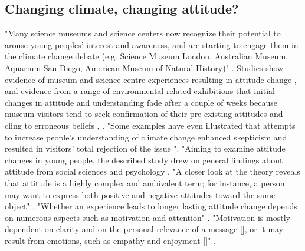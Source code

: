 \subsection{Changing climate, changing attitude?}
"Many science museums and science centers now recognize their potential to arouse young peoples’ interest and awareness, and are starting to engage them in the climate change debate (e.g. Science Museum London, Australian Museum, Aquarium San Diego, American Museum of Natural History)" \autocite[p. 95]{gorr_changing_2014}. Studies show evidence of museum and science-centre experiences resulting in attitude change \autocite{smithsonian_2011}, and evidence from a range of environmental-related exhibitions that initial changes in attitude and understanding fade after a couple of weeks because museum visitors tend to seek confirmation of their pre-existing attitudes and cling to erroneous beliefs \autocite{Adelman_2000}, \autocite{Cakir_2008}. "Some examples have even illustrated that attempts to increase people’s understanding of climate change enhanced skepticism and resulted in visitors’ total rejection of the issue \autocite{guardian_2009}". "Aiming to examine attitude changes in young people, the described study drew on general findings about attitude from social sciences and psychology \autocite[p. 96]{gorr_changing_2014}. "A closer look at the theory reveals that attitude is a highly complex and ambivalent term; for instance, a person may want to express both positive and negative attitudes toward the same object" \autocite[p. 96]{gorr_changing_2014}. "Whether an experience leads to longer lasting attitude change depends on numerous aspects such as motivation and attention" \autocite[p. 96]{gorr_changing_2014}. "Motivation is mostly dependent on clarity and on the personal relevance of a message [\autocite{salazar_mediations_2011}], or it may result from emotions, such as empathy and enjoyment [\autocite{Roberts_1997}]" \autocite[p. 96]{gorr_changing_2014}.

\break
